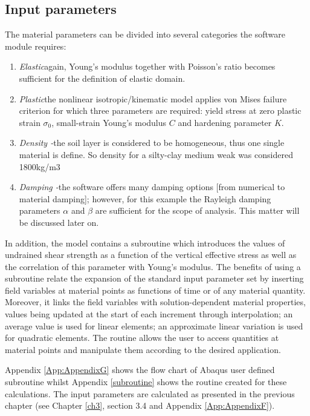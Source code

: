 	\subsection{Input parameters}
	The material parameters can be divided into several categories the software module requires:
	\begin{enumerate}
		\item \textit{Elastic}\quad again, Young's modulus together with Poisson's ratio becomes sufficient for the definition of elastic domain.
		\item \textit{Plastic}\quad the nonlinear isotropic/kinematic model applies von Mises failure criterion for which three parameters are required: yield stress at zero plastic strain $\sigma_0$, small-strain Young's modulus $C$ and hardening parameter $K$.
		\item\textit{Density -}\quad the soil layer is considered to be homogeneous, thus one single material is define. So density for a silty-clay medium weak was considered 1800kg/m3
		\item \textit{Damping -}\quad the software offers many damping options [from numerical to material damping]; however, for this example the Rayleigh damping parameters $\alpha$ and $\beta$ are sufficient for the scope of analysis. This matter will be discussed later on.
	\end{enumerate}
	
	In addition, the model contains a subroutine which introduces the values of undrained shear strength as a function of the vertical effective stress as well as the correlation of this parameter with Young's modulus. The benefits of using a subroutine relate the expansion of the standard input parameter set by inserting field variables at material points as functions of time or of any material quantity. Moreover, it links the field variables with solution-dependent material properties, values being updated at the start of each increment through interpolation; an average value is used for linear elements; an approximate linear variation is used for quadratic elements. The routine allows the user to access quantities at material points and manipulate them according to the desired application. 
	
	Appendix \ref{App:AppendixG} shows the flow chart of Abaqus user defined subroutine whilst Appendix \ref{subroutine} shows the routine created for these calculations. The input parameters are calculated as presented in the previous chapter (see Chapter \ref{ch3}, section 3.4 and Appendix \ref{App:AppendixF}).  
	
